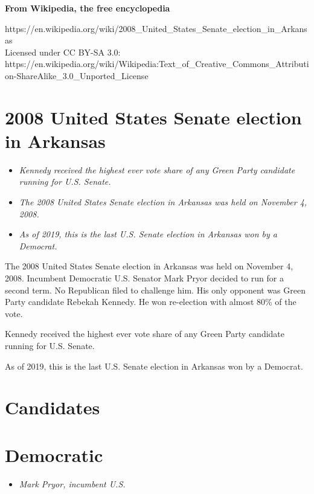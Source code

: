 \textbf{From Wikipedia, the free encyclopedia}

https://en.wikipedia.org/wiki/2008\_United\_States\_Senate\_election\_in\_Arkansas\\
Licensed under CC BY-SA 3.0:\\
https://en.wikipedia.org/wiki/Wikipedia:Text\_of\_Creative\_Commons\_Attribution-ShareAlike\_3.0\_Unported\_License

\section{2008 United States Senate election in
Arkansas}\label{united-states-senate-election-in-arkansas}

\begin{itemize}
\item
  \emph{Kennedy received the highest ever vote share of any Green Party
  candidate running for U.S. Senate.}
\item
  \emph{The 2008 United States Senate election in Arkansas was held on
  November 4, 2008.}
\item
  \emph{As of 2019, this is the last U.S. Senate election in Arkansas
  won by a Democrat.}
\end{itemize}

The 2008 United States Senate election in Arkansas was held on November
4, 2008. Incumbent Democratic U.S. Senator Mark Pryor decided to run for
a second term. No Republican filed to challenge him. His only opponent
was Green Party candidate Rebekah Kennedy. He won re-election with
almost 80\% of the vote.

Kennedy received the highest ever vote share of any Green Party
candidate running for U.S. Senate.

As of 2019, this is the last U.S. Senate election in Arkansas won by a
Democrat.

\section{Candidates}\label{candidates}

\section{Democratic}\label{democratic}

\begin{itemize}
\item
  \emph{Mark Pryor, incumbent U.S.}
\end{itemize}

